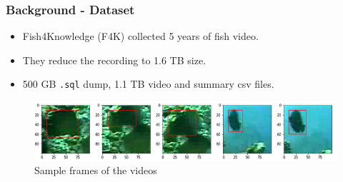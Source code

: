 \documentclass{beamer}[fullspacing]
\begin{document}
\begin{frame}
\frametitle{Background - Dataset}

\begin{itemize}
\item
Fish4Knowledge (F4K)\cite{F4K} collected 5 years of fish video.
\item
They reduce the recording to 1.6 TB size.
\item
500 GB {\tt .sql} dump, 1.1 TB video and summary csv files.
\end{itemize}

\begin{figure}
\includegraphics[scale=0.4]{image/sample.png}
\caption{Sample frames of the videos}
\end{figure}

\end{frame}
\end{document}
